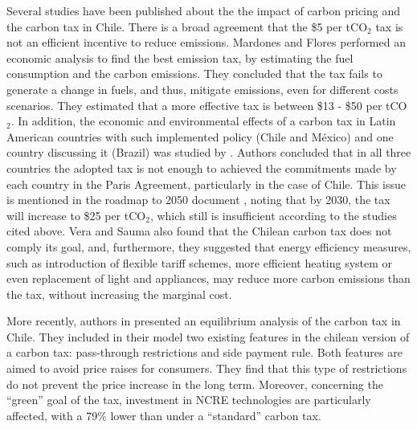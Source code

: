 \documentclass[11pt, letterpaper]{article}
\begin{document}

\smallskip

Several studies have been published about the the impact of carbon pricing and the carbon tax in Chile. There is a broad agreement that the \$5 per tCO$_2$ tax is not an efficient incentive to reduce emissions. Mardones and Flores \cite{mardones2017evaluation} performed an economic analysis to find the best emission tax, by estimating the fuel consumption and the carbon emissions. They concluded that the tax fails to generate a change in fuels, and thus, mitigate emissions, even for different costs scenarios. They estimated that a more effective tax is between \$13 - \$50 per  tCO$_2$. In addition, the economic and environmental effects of a carbon tax in Latin American countries with such implemented policy (Chile and M\'exico) and one country discussing it (Brazil) was studied by \cite{mardones2018economic}. Authors concluded that in all three countries the adopted tax is not enough to achieved the commitments made by each country in the Paris Agreement, particularly in the case of Chile. This issue is mentioned in the roadmap to 2050 document \cite{HojadeRuta}, noting that by 2030, the tax will increase to \$25 per tCO$_2$, which still is insufficient according to the studies cited above. Vera and Sauma \cite{vera2015does} also found that the Chilean carbon tax does not comply its goal, and, furthermore, they suggested that energy efficiency measures, such as introduction of flexible tariff schemes, more efficient heating system or even replacement of light and appliances, may reduce more carbon emissions than the tax, without increasing the marginal cost. 

\smallskip

More recently, authors in \cite{diaz2020equilibrium} presented an equilibrium analysis of the carbon tax in Chile. They included in their model two existing features in the chilean version of a carbon tax: pass-through restrictions and side payment rule. Both features are aimed to avoid  price raises for consumers. They find that this type of restrictions do not prevent the price increase in the long term. Moreover, concerning the ``green'' goal of the tax, investment in NCRE technologies are particularly affected, with a 79\% lower than under a ``standard'' carbon tax. 
\end{document}
